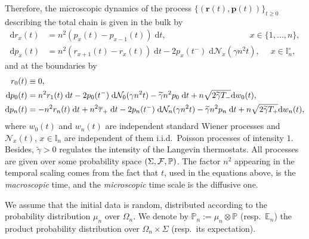 \documentclass[EJP]{ejpecp} %
\newcommand\E{{\mathbb E}}
\newcommand\T{{\mathbb I}}
\newcommand\bbP{{\mathbb P}}
\newcommand \si{\sigma}
\newcommand\Om{\Omega}
\renewcommand{\ge}{\geqslant}
\newcommand{\dd  }{\mathrm{d}}
\renewcommand{\tilde}{\widetilde}
\renewcommand{\bar}{\overline}
\numberwithin{equation}{section}
\begin{document}
Therefore, the microscopic dynamics of
the process $\{(\mathbf r(t), \mathbf p(t))\}_{t\ge0}$
describing the total chain is  given in the bulk by 
\begin{equation} 
\label{eq:qdynamicsbulk}
\begin{aligned}
    \dd   r_x(t) &= n^2 \left(p_x(t)- p_{x-1}(t)\right) \; \dd   t,\qquad \qquad \qquad  \qquad \qquad x\in \{1, \dots, n\},\\
    \dd   p_x(t) &= n^2 \left(r_{x+1}(t)- r_x(t)\right) \; \dd   t -  2p_x(t^-)
    \; \dd   \mathcal N_x(\gamma n^2t), \; \quad x\in\T_n^{\circ},\end{aligned} \end{equation} and at the boundaries by
     \begin{align}\label{eq:qdynamicsbound} 
r_0(t)&\equiv0,\notag\\
     \dd   p_0(t) &= n^2  r_1(t)  \; \dd   t %
     - 2p_0(t^-)
        \; \dd   \mathcal N_0(\gamma n^2t) - \tilde\gamma n^2 p_0 \; \dd   t + n\sqrt{2\tilde\gamma T_-} \dd w_0(t),  \\
 \dd   p_n(t) &= -n^2  r_n(t) \; \dd   t  + n^2 \bar\tau_+ \; \dd t - 2p_n(t^-)
    \; \dd   \mathcal N_n(\gamma n^2t) - \tilde\gamma n^2 p_n \; \dd   t + n\sqrt{2 \tilde\gamma T_+} \dd w_n(t), \notag
  \end{align}
where $w_0(t)$ and $w_n(t)$ are independent
standard Wiener processes and $\mathcal N_x(t)$, $x\in\T_n$ are
independent of them i.i.d.~Poisson processes of intensity
$1$. Besides, $\tilde\gamma>0$ regulates the intensity of the Langevin thermostats. All processes are given
over some probability space $(\Sigma,{\cal F},\bbP)$. The factor
$n^2$ appearing in the temporal scaling comes from the fact that $t$,
used in the equations above,
is the \emph{macroscopic}  time, and the \emph{microscopic} time scale is the diffusive one. 

We assume that the initial data is random,
distributed according to the  probability distribution $\mu_n$ over $\Om_n$.
We denote by $\bbP_n:=\mu_n\otimes \bbP$ (resp.~$\E_n$) the product probability distribution over $\Om_n\times\Sigma$ (resp.~its expectation).



\end{document}
